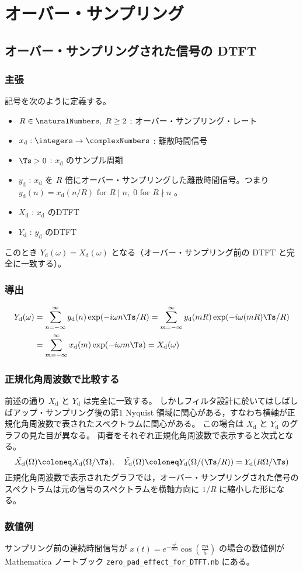 \chapter{オーバー・サンプリング}
    \section{オーバー・サンプリングされた信号の DTFT}
        \label{オーバー・サンプリングされた信号の DTFT}
        \newcommand{\xd}{x_\text{d}}
        \newcommand{\yd}{y_\text{d}}
        \newcommand{\Xd}{X_\text{d}}
        \newcommand{\Yd}{Y_\text{d}}
        \subsection{主張}
            記号を次のように定義する。
            \begin{itemize}
                \item $R\in\naturalNumbers,\;R\geq 2$ : オーバー・サンプリング・レート
                \item $\xd:\integers\to\complexNumbers$ : 離散時間信号
                \item $\Ts>0$ : $\xd$ のサンプル周期
                \item $\yd$ : $\xd$ を $R$ 倍にオーバー・サンプリングした離散時間信号。つまり $\yd(n) = \xd(n/R)\text{ for }R\mid n,\;0\text{ for }R\nmid n$ 。
                \item $\Xd$ : $\xd$ のDTFT
                \item $\Yd$ : $\yd$ のDTFT
            \end{itemize}
            このとき $\Yd(\omega) = \Xd(\omega)$ となる（オーバー・サンプリング前の DTFT と完全に一致する）。
        \subsection{導出}
            \begin{align*}
                \Yd(\omega) &= \sum_{n=-\infty}^\infty \yd(n)\exp(-i\omega n\Ts/R) = \sum_{m=-\infty}^\infty \yd(mR)\exp(-i\omega (mR)\Ts/R) \\
                &= \sum_{m=-\infty}^\infty \xd(m)\exp(-i\omega m\Ts) = \Xd(\omega)
            \end{align*}
        \subsection{正規化角周波数で比較する}
            前述の通り $\Xd$ と $\Yd$ は完全に一致する。
            しかしフィルタ設計に於いてはしばしばアップ・サンプリング後の第1 Nyquist 領域に関心がある，すなわち横軸が正規化角周波数で表されたスペクトラムに関心がある。
            この場合は $\Xd$ と $\Yd$ のグラフの見た目が異なる。
            両者をそれぞれ正規化角周波数で表示すると次式となる。
            \[ \tilde{\Xd}(\Omega) \coloneq \Xd(\Omega/\Ts),\quad \tilde{\Yd}(\Omega) \coloneq \Yd(\Omega/(\Ts/R)) = \Yd(R\Omega/\Ts) \]
            正規化角周波数で表示されたグラフでは，オーバー・サンプリングされた信号のスペクトラムは元の信号のスペクトラムを横軸方向に $1/R$ に縮小した形になる。
        \subsection{数値例}
            サンプリング前の連続時間信号が $x(t) = e^{-\frac{n^2}{800}}\cos\left(\frac{\pi n}{5}\right)$ の場合の数値例が Mathematica ノートブック \verb|zero_pad_effect_for_DTFT.nb| にある。

